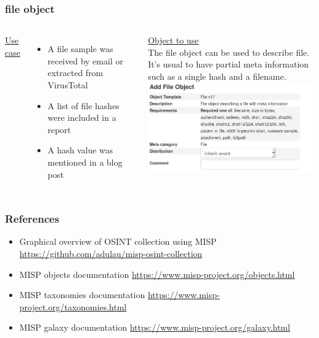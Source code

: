 \begin{frame}
\frametitle{file object}
\begin{columns}[totalwidth=\textwidth]
        \underline{Use case}\\
        \begin{itemize}
                \item A file sample was received by email or extracted from VirusTotal
                \item A list of file hashes were included in a report
                \item A hash value was mentioned in a blog post
        \end{itemize}
        \underline{Object to use}\\
        The file object can be used to describe file. It's usual to have partial meta information such as a single hash and a filename.\\
        \includegraphics[scale=0.25]{fileobject.png}
\end{columns}
\end{frame}

\begin{frame}
        \frametitle{References}
        \begin{itemize}
        \item Graphical overview of OSINT collection using MISP \url{https://github.com/adulau/misp-osint-collection}
        \item MISP objects documentation \url{https://www.misp-project.org/objects.html}
        \item MISP taxonomies documentation \url{https://www.misp-project.org/taxonomies.html}
        \item MISP galaxy documentation \url{https://www.misp-project.org/galaxy.html}
        \end{itemize}
\end{frame}

